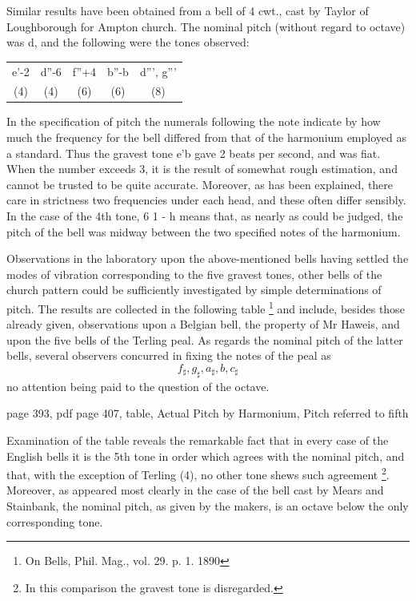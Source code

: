 Similar results have been obtained from a bell of 4 cwt., cast
by Taylor of Loughborough for Ampton church. The nominal
pitch (without regard to octave) was d, and the following were the
tones observed:
\begin{tabular}{ccccc}
e'-2& d''-6& f''+4& b''-b& d''', g''' \\
(4) & (4)  &(6)   &(6)   &(8) \\
\end{tabular}
In the specification of pitch the numerals following the note indicate by how
much the frequency for the bell differed from that of the harmonium employed as
a standard. Thus the gravest tone e'b gave 2 beats per second, and was fiat.
When the number exceeds 3, it is the result of somewhat rough estimation, and
cannot be trusted to be quite accurate. Moreover, as has been explained, there
care in strictness two frequencies under each head, and these often differ
sensibly. In the case of the 4th tone, 6 1 - h means that, as nearly as could
be judged, the pitch of the bell was midway between the two specified notes of
the harmonium.

Observations in the laboratory upon the above-mentioned bells having settled
the modes of vibration corresponding to the five gravest tones, other bells of
the church pattern could be sufficiently investigated by simple determinations
of pitch. The results are collected in the following table
\footnote{On Bells, Phil. Mag., vol. 29. p. 1. 1890} and include,
besides those already given, observations upon a Belgian bell, the property of
Mr Haweis, and upon the five bells of the Terling peal. As regards
the nominal pitch of the latter bells,
several observers concurred in fixing the notes of the peal as
\[ f_{\sharp}, g_{\sharp}, a_{\sharp}, b, c_{\sharp} \]
no attention being paid to the question of the octave.

page 393,  pdf page 407, table, Actual Pitch by Harmonium, Pitch referred to fifth

Examination of the table reveals the remarkable fact that in every case of
the English bells it is the 5th tone in order which agrees with the nominal
pitch, and that, with the exception of Terling (4), no other tone shews such
agreement \footnote{In this comparison the gravest tone is disregarded.}.
Moreover, as appeared most clearly in the case of the bell cast by
Mears and Stainbank, the nominal pitch, as given by the makers, is an octave
below the only corresponding tone.

